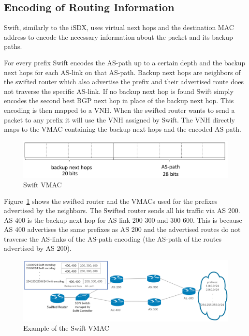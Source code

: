 \newpage

\subsection{\label{chapter2:Swift:encoding_of_routing_information}Encoding of Routing Information}
Swift, similarly to the iSDX, uses virtual next hops and the destination MAC address to encode the necessary information about the packet and its backup paths.

For every prefix Swift encodes the AS-path up to a certain depth and the backup next hops for each AS-link on that AS-path. Backup next hops are neighbors of the swifted router which also advertise the prefix and their advertised route does not traverse the specific AS-link. If no backup next hop is found Swift simply encodes the second best BGP next hop in place of the backup next hop. This encoding is then mapped to a VNH. When the swifted router wants to send a packet to any prefix it will use the VNH assigned by Swift. The VNH directly maps to the VMAC containing the backup next hops and the encoded AS-path. 


\begin{figure}[h]
\center
\includegraphics[scale = 0.6]{Figures/swift_vmac3_cropped.pdf}
\caption{Swift VMAC}
\end{figure}

Figure~\ref{fig:swift_vmac} shows the swifted router and the VMACs used for the prefixes advertised by the neighbors. The Swifted router sends all his traffic via AS 200. AS 400 is the backup next hop for AS-link 200 300 and 300 600. This is because AS 400 advertises the same prefixes as AS 200 and the advertised routes do not traverse the AS-links of the AS-path encoding (the AS-path of the routes advertised by AS 200).

\begin{figure}[h]
\center
\includegraphics[scale = 0.25]{Figures/bckgrnd_swift_topology.pdf}
\caption{Example of the Swift VMAC}
\label{fig:swift_vmac}
\end{figure}

